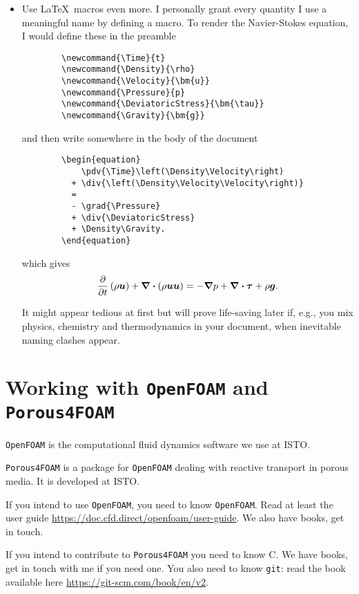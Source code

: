 \documentclass[a4paper]{article}
\newcommand{\Time}{t}
\newcommand{\Density}{\rho}
\newcommand{\Velocity}{\bm{u}}
\newcommand{\Pressure}{p}
\newcommand{\DeviatoricStress}{\bm{\tau}}
\newcommand{\Gravity}{\bm{g}}
\newcommand{\Rplus}{\protect\hspace{-.1em}\protect\raisebox{.35ex}{\smaller{\smaller\textbf{+}}}}
\newcommand{\Cpp}{\mbox{C\Rplus\Rplus}\xspace}
\newcommand{\OF}{\texttt{OpenFOAM}\xspace}
\newcommand{\PF}{\texttt{Porous4FOAM}\xspace}
\newcommand{\GIT}{\texttt{git}\xspace}
\begin{document}
\begin{itemize}
    \item Use \LaTeX\ macros even more. I personally grant every quantity I use 
    a meaningful name by defining a macro. To render the Navier-Stokes equation,
    I would define these in the preamble
    \begin{verbatim}
        \newcommand{\Time}{t}
        \newcommand{\Density}{\rho}
        \newcommand{\Velocity}{\bm{u}}
        \newcommand{\Pressure}{p}
        \newcommand{\DeviatoricStress}{\bm{\tau}}
        \newcommand{\Gravity}{\bm{g}}
    \end{verbatim}
    and then write somewhere in the body of the document
    \begin{verbatim}
        \begin{equation}
            \pdv{\Time}\left(\Density\Velocity\right) 
          + \div{\left(\Density\Velocity\Velocity\right)} 
          = 
          - \grad{\Pressure} 
          + \div{\DeviatoricStress} 
          + \Density\Gravity.
        \end{equation}
    \end{verbatim}
    which gives
    \begin{equation}
          \pdv{\Time}\left(\Density\Velocity\right) 
        + \div{\left(\Density\Velocity\Velocity\right)} 
        = 
        - \grad{\Pressure} 
        + \div{\DeviatoricStress} 
        + \Density\Gravity.
    \end{equation}

    It might appear tedious at first but will prove life-saving later if, e.g., 
    you mix physics, chemistry and thermodynamics in your document, when 
    inevitable naming clashes appear.
\end{itemize}


\section{Working with \OF and \PF}

\OF is the computational fluid dynamics software we use at ISTO.

\PF is a package for \OF dealing with reactive transport in porous media. 
It is developed at ISTO.

If you intend to use \OF, you need to know \OF.
Read at least the user guide \url{https://doc.cfd.direct/openfoam/user-guide}.
We also have books, get in touch.

If you intend to contribute to \PF you need to know \Cpp. We have books, 
get in touch with me if you need one.
You also need to know \GIT: read the book  available here
\url{https://git-scm.com/book/en/v2}.
\end{document}
